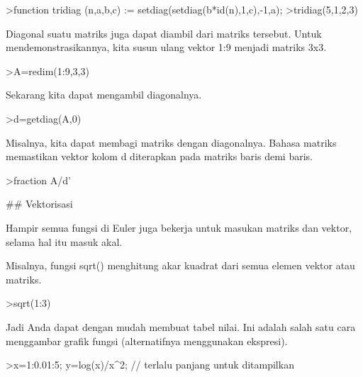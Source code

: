 \documentclass[a4paper,10pt]{article}
\begin{document}
\begin{eulernotebook}
\begin{euleroutput}
\end{euleroutput}
\begin{eulerprompt}
>function tridiag (n,a,b,c) := setdiag(setdiag(b*id(n),1,c),-1,a);
>tridiag(5,1,2,3)
\end{eulerprompt}
\begin{euleroutput}
  
  Diagonal suatu matriks juga dapat diambil dari matriks tersebut. Untuk mendemonstrasikannya, kita susun ulang vektor 1:9 menjadi matriks 3x3.
  
\end{euleroutput}
\begin{eulerprompt}
>A=redim(1:9,3,3)
\end{eulerprompt}
\begin{euleroutput}
  
  Sekarang kita dapat mengambil diagonalnya.
  
\end{euleroutput}
\begin{eulerprompt}
>d=getdiag(A,0)
\end{eulerprompt}
\begin{euleroutput}
  
  Misalnya, kita dapat membagi matriks dengan diagonalnya. Bahasa matriks memastikan vektor kolom d diterapkan pada matriks baris demi baris.
  
\end{euleroutput}
\begin{eulerprompt}
>fraction A/d'
\end{eulerprompt}
\begin{euleroutput}
  
  ## Vektorisasi
  
  Hampir semua fungsi di Euler juga bekerja untuk masukan matriks dan vektor, selama hal itu masuk akal.
  
  Misalnya, fungsi sqrt() menghitung akar kuadrat dari semua elemen vektor atau matriks.
  
\end{euleroutput}
\begin{eulerprompt}
>sqrt(1:3)
\end{eulerprompt}
\begin{euleroutput}
  
  Jadi Anda dapat dengan mudah membuat tabel nilai. Ini adalah salah satu cara menggambar grafik fungsi (alternatifnya menggunakan ekspresi).
  
\end{euleroutput}
\begin{eulerprompt}
>x=1:0.01:5; y=log(x)/x^2; // terlalu panjang untuk ditampilkan
\end{eulerprompt}
\begin{euleroutput}
  

\end{euleroutput}
\end{eulernotebook}
\end{document}

